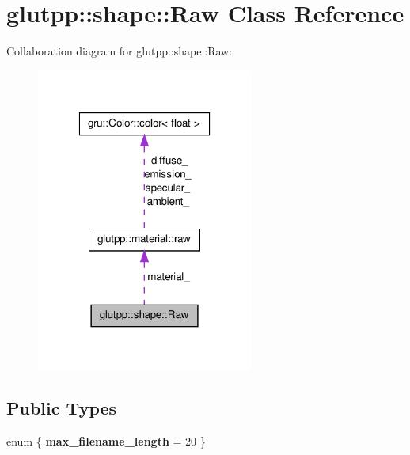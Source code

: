 \hypertarget{classglutpp_1_1shape_1_1Raw}{\section{glutpp\-:\-:shape\-:\-:\-Raw \-Class \-Reference}
\label{classglutpp_1_1shape_1_1Raw}
}


\-Collaboration diagram for glutpp\-:\-:shape\-:\-:\-Raw\-:
\nopagebreak
\begin{figure}[H]
\begin{center}
\leavevmode
\includegraphics[width=202pt]{classglutpp_1_1shape_1_1Raw__coll__graph}
\end{center}
\end{figure}
\subsection*{\-Public \-Types}
\begin{DoxyCompactItemize}
\item 
enum \{ {\bfseries max\-\_\-filename\-\_\-length} =  20
 \}
\end{DoxyCompactItemize}
